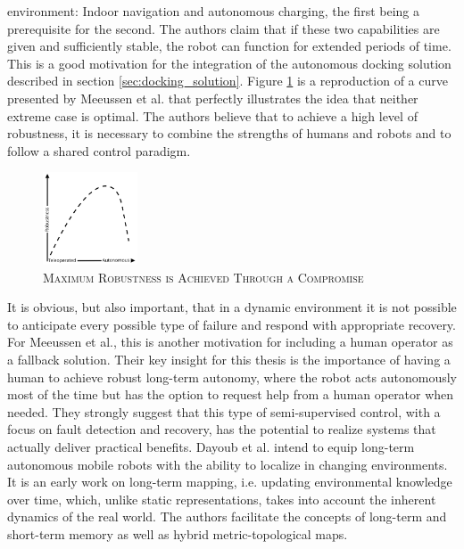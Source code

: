 \documentclass[english, master, utf8]{base/thesis_KBS}
\begin{document}
environment: Indoor navigation and autonomous charging, the first being a prerequisite for the second. The authors claim that if these two capabilities are given and sufficiently
stable, the robot can function for extended periods of time. This is a good motivation for the integration of the autonomous docking solution described in section
\ref{sec:docking_solution}. Figure \ref{fig:autonomy_robustness} is a reproduction of a curve presented by Meeussen et al. \cite{Meeussen:2011} that perfectly illustrates the idea that
neither extreme case is optimal. The authors believe that to achieve a high level of robustness, it is necessary to combine the strengths of humans and robots and to follow a shared
control paradigm.
\begin{figure}[H]
    \centering
    \includegraphics[width=0.25\textwidth]{pics/autonomy_robustness.png}
    \caption{\textsc{Maximum Robustness is Achieved Through a Compromise}}
    \label{fig:autonomy_robustness}
\end{figure}
\noindent
It is obvious, but also important, that in a dynamic environment it is not possible to anticipate every possible type of failure and respond with appropriate recovery.
\cite{Meeussen:2011} For Meeussen et al., this is another motivation for including a human operator as a fallback solution. Their key insight for this thesis is the importance of having
a human  to achieve robust long-term autonomy, where the robot acts autonomously most of the time but has the option to request help from a human operator
when needed. They strongly suggest that this type of semi-supervised control, with a focus on fault detection and recovery, has the potential to realize systems that actually deliver
practical benefits.\newline
Dayoub et al. \cite{Dayoub:2011} intend to equip long-term autonomous mobile robots with the ability to localize in changing environments. It is an early work on long-term mapping,
i.e. updating environmental knowledge over time, which, unlike static representations, takes into account the inherent dynamics of the real world. The authors facilitate the concepts
of long-term and short-term memory as well as hybrid metric-topological maps.\newline
\end{document}
